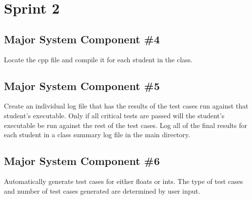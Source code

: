 \section{Sprint 2}

\subsection{Major System Component \#4}
Locate the cpp file and compile it for each student in the class.

\subsection{Major System Component \#5}
Create an individual log file that has the results of the test cases run against
that student's executable. Only if all critical tests are passed will the student's
executable be run against the rest of the test cases. Log all of the final results
for each student in a class summary log file in the main directory.

\subsection{Major System Component \#6}
Automatically generate test cases for either floats or ints. The type of test cases
and number of test cases generated are determined by user input.

